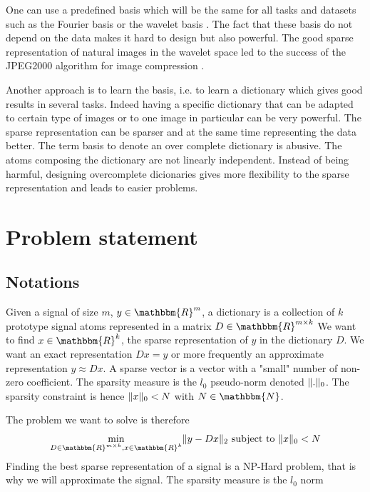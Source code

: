 \documentclass[a4paper,11pt]{article}
\newcommand{\RR}{\mathbbm{R}} %
\DeclarePairedDelimiter\norm{\lVert}{\rVert} %
\begin{document}
One can use a predefined basis which will be the same for all tasks and datasets such as the Fourier basis or the wavelet basis \cite{mallat1999}.
The fact that these basis do not depend on the data makes it hard to design but also powerful.
The good sparse representation of natural images in the wavelet space led to the success of the JPEG2000 algorithm for image compression \cite{marcellin00}.

Another approach is to learn the basis, i.e. to learn a dictionary which gives good results in several tasks. Indeed having a specific dictionary that can be adapted to certain type of images or to one image in particular can be very powerful.
The sparse representation can be sparser and at the same time representing the data better.
The term basis to denote an over complete dictionary is abusive. The atoms composing the dictionary are not linearly independent.
Instead of being harmful, designing overcomplete dicionaries gives more flexibility to the sparse representation and leads to easier problems.

\section{Problem statement}
\subsection{Notations}
Given a signal of size $m$, $y \in \RR^m$, a dictionary is a collection of $k$ prototype signal atoms represented in a matrix $D \in \RR^{m \times k}$
We want to find $x \in \RR^k$, the sparse representation of $y$ in the dictionary $D$.
We want an exact representation $D x = y$ or more frequently an approximate representation $y \approx D x$.
A sparse vector is a vector with a "small" number of non-zero coefficient.
The sparsity measure is the $l_0$ pseudo-norm denoted $\norm{.}_0$.
The sparsity constraint is hence $\norm{x}_0<N$ with $N \in \mathbbm{N}$.

The problem we want to solve is therefore
\begin{equation*}
\min\limits_{D \in \RR^{m \times k}, x \in \RR^k} \norm{y - Dx}_2  \text{ subject to } \norm{x}_0<N
\end{equation*}
Finding the best sparse representation of a signal is a NP-Hard problem, that is why we will approximate the signal.
The sparsity measure is the $l_0$ norm
\end{document}
